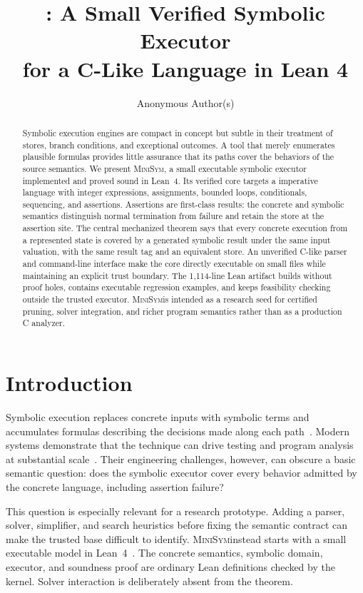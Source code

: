 \documentclass[10pt,twocolumn]{article}
\title{\tool: A Small Verified Symbolic Executor\\for a C-Like Language in Lean 4}
\author{Anonymous Author(s)}
\date{}
\newcommand{\tool}{\textsc{MiniSym}}
\newcommand{\code}[1]{\texttt{\detokenize{#1}}}
\begin{document}
\maketitle

\begin{abstract}
Symbolic execution engines are compact in concept but subtle in their treatment
of stores, branch conditions, and exceptional outcomes.  A tool that merely
enumerates plausible formulas provides little assurance that its paths cover the
behaviors of the source semantics.  We present \tool, a small executable symbolic
executor implemented and proved sound in Lean~4.  Its verified core targets a
imperative language with integer expressions, assignments, bounded
\code{while} loops, conditionals, sequencing, and assertions.  Assertions are first-class results:
the concrete and symbolic semantics distinguish normal termination from failure
and retain the store at the assertion site.  The central mechanized theorem says
that every concrete execution from a represented state is covered by a generated
symbolic result under the same input valuation, with the same result tag and an
equivalent store.  An unverified C-like parser and command-line interface make
the core directly executable on small \code{.c} files while maintaining an
explicit trust boundary.  The 1,114-line Lean artifact builds without proof holes,
contains executable regression examples, and keeps feasibility checking outside
the trusted executor.  \tool is intended as a research seed for certified
pruning, solver integration, and richer program semantics rather than as a
production C analyzer.
\end{abstract}

\section{Introduction}

Symbolic execution replaces concrete inputs with symbolic terms and accumulates
formulas describing the decisions made along each path~\cite{king1976}.  Modern
systems demonstrate that the technique can drive testing and program analysis at
substantial scale~\cite{klee,rosette}.  Their engineering challenges, however,
can obscure a basic semantic question: does the symbolic executor cover every
behavior admitted by the concrete language, including assertion failure?

This question is especially relevant for a research prototype.  Adding a parser,
solver, simplifier, and search heuristics before fixing the semantic contract can
make the trusted base difficult to identify.  \tool instead starts with a small
executable model in Lean~4~\cite{lean4}.  The concrete semantics, symbolic domain,
executor, and soundness proof are ordinary Lean definitions checked by the
kernel.  Solver interaction is deliberately absent from the theorem.
\end{document}
